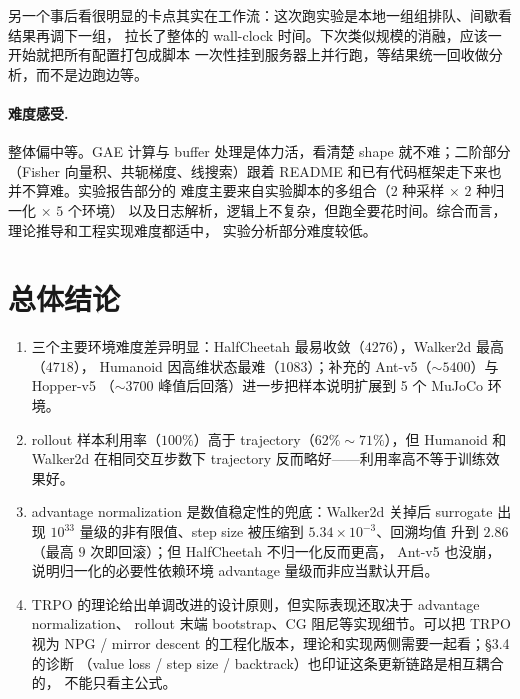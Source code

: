 \documentclass[12pt]{article}
\begin{document}
另一个事后看很明显的卡点其实在工作流：这次跑实验是本地一组组排队、间歇看结果再调下一组，
拉长了整体的 wall-clock 时间。下次类似规模的消融，应该一开始就把所有配置打包成脚本
一次性挂到服务器上并行跑，等结果统一回收做分析，而不是边跑边等。

\paragraph{难度感受.}
整体偏中等。GAE 计算与 buffer 处理是体力活，看清楚 shape 就不难；二阶部分（Fisher
向量积、共轭梯度、线搜索）跟着 README 和已有代码框架走下来也并不算难。实验报告部分的
难度主要来自实验脚本的多组合（$2$ 种采样 $\times$ $2$ 种归一化 $\times$ $5$ 个环境）
以及日志解析，逻辑上不复杂，但跑全要花时间。综合而言，理论推导和工程实现难度都适中，
实验分析部分难度较低。

\section{总体结论}

\begin{enumerate}
    \item 三个主要环境难度差异明显：HalfCheetah 最易收敛（$4276$），Walker2d 最高（$4718$），
          Humanoid 因高维状态最难（$1083$）；补充的 Ant-v5（$\sim 5400$）与 Hopper-v5
          （$\sim 3700$ 峰值后回落）进一步把样本说明扩展到 5 个 MuJoCo 环境。
    \item rollout 样本利用率（$100\%$）高于 trajectory（$62\%\sim71\%$），但 Humanoid 和
          Walker2d 在相同交互步数下 trajectory 反而略好——利用率高不等于训练效果好。
    \item advantage normalization 是数值稳定性的兜底：Walker2d 关掉后 surrogate
          出现 $10^{33}$ 量级的非有限值、step size 被压缩到 $5.34\times 10^{-3}$、回溯均值
          升到 $2.86$（最高 $9$ 次即回滚）；但 HalfCheetah 不归一化反而更高，
          Ant-v5 也没崩，说明归一化的必要性依赖环境 advantage 量级而非应当默认开启。
    \item TRPO 的理论给出单调改进的设计原则，但实际表现还取决于 advantage normalization、
          rollout 末端 bootstrap、CG 阻尼等实现细节。可以把 TRPO 视为 NPG / mirror descent
          的工程化版本，理论和实现两侧需要一起看；§3.4 的诊断
          （value loss / step size / backtrack）也印证这条更新链路是相互耦合的，
          不能只看主公式。
\end{enumerate}
\end{document}
